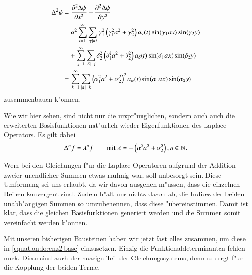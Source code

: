 \begin{align*}
\laplace^2\psi
&= 
\frac{\partial^2\laplace\psi}{\partial x^2} + 
\frac{\partial^2\laplace\psi}{\partial y^2}
\\
&=
a^2
\sum_{i = 1}^{\infty}
\sum_{|\gamma| = i}
\gamma_1^2
\left(\gamma_1^2 a^2+\gamma_2^2\right)
a_{\gamma}(t)
\sin(\gamma_1 ax) \sin(\gamma_2 y)
\\
&\phantom{={}}
+
\sum_{j = 1}^{\infty}
\sum_{|\delta| = j}
\delta_2^2
\left(\delta_1^2 a^2+\delta_2^2\right)
a_{\delta}(t)
\sin(\delta_1 ax) \sin(\delta_2 y)
\\
&=
\sum_{k = 1}^{\infty}
\sum_{|\alpha| = k}
\left(\alpha_1^2 a^2+\alpha_2^2\right)^2
a_{\alpha}(t)
\sin(\alpha_1 ax) \sin(\alpha_2 y)
\end{align*}
zusammenbauen k"onnen.

Wie wir hier sehen, sind nicht nur die urspr"unglichen, sondern auch auch die 
erweiterten Basisfunktionen nat"urlich wieder Eigenfunktionen des 
Laplace-Operators. Es gilt dabei
\begin{equation*}
	\laplace^n f = \lambda^n f
	\qquad
	\text{mit }
	\lambda = -\left(\alpha_1^2 a^2+\alpha_2^2\right),
	n \in \mathbb{N}.
\end{equation*}

Wem bei den Gleichungen f"ur die Laplace Operatoren aufgrund der Addition 
zweier unendlicher Summen etwas mulmig war, soll unbesorgt sein. Diese 
Umformung sei uns erlaubt, da wir davon ausgehen m"ussen, dass die einzelnen 
Reihen konvergent sind. Zudem h"alt uns nichts davon ab, die 
Indices der beiden unabh"angigen Summen so umzubenennen, dass diese 
"ubereinstimmen. Damit ist klar, dass die gleichen Basisfunktionen generiert 
werden und die Summen somit vereinfacht werden k"onnen.

Mit unseren bisherigen Bausteinen haben wir jetzt fast alles zusammen, um diese 
in \cref{equation:lorenz2:base} einzusetzen. Einzig die Funktionaldeterminanten 
fehlen noch. Diese sind auch der haarige Teil des Gleichungssystems, denn es 
sorgt f"ur die Kopplung der beiden Terme.

